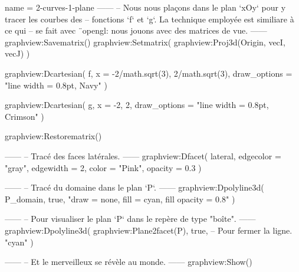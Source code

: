 \documentclass{standalone}
\begin{document}
\begin{luadraw}{name = 2-curves-1-plane}
------
-- Nous nous plaçons dans le plan `xOy` pour y tracer les courbes des
-- fonctions  `f` et `g`. La technique employée est similiare à ce qui
-- se fait avec ¨opengl: nous jouons avec des matrices de vue.
------
graphview:Savematrix()
  graphview:Setmatrix(
    graphview:Proj3d({Origin, vecI, vecJ})
  )

  graphview:Dcartesian(
    f,
    {
      x = {-2/math.sqrt(3), 2/math.sqrt(3)},
      draw_options = "line width = 0.8pt, Navy"
    }
  )

  graphview:Dcartesian(
    g,
    {
      x = {-2, 2},
      draw_options = "line width = 0.8pt, Crimson"
    }
  )

graphview:Restorematrix()

------
-- Tracé des faces latérales.
------
graphview:Dfacet(
  lateral,
  {
    edgecolor = "gray",
    edgewidth = 2,
    color     = "Pink",
    opacity   = 0.3
  }
)

------
-- Tracé du domaine dans le plan `P`.
------
graphview:Dpolyline3d(
  P_domain,
  true,
  "draw = none, fill = cyan, fill opacity = 0.8"
)

------
-- Pour visualiser le plan `P` dans le repère de type "boîte".
------
graphview:Dpolyline3d(
  graphview:Plane2facet(P),
  true,   -- Pour fermer la ligne.
  "cyan"
)

------
-- Et le merveilleux se révèle au monde.
------
graphview:Show()
\end{luadraw}
\end{document}

